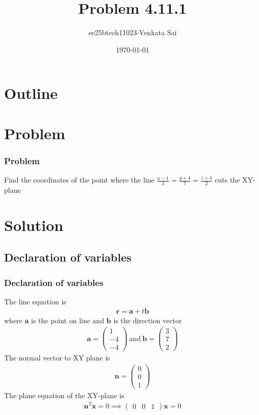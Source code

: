 \documentclass{beamer}
\title{Problem 4.11.1}
\author{ee25btech11023-Venkata Sai}
\date{\today}
\theoremstyle{remark}
\newcommand{\myvec}[1]{\ensuremath{\begin{pmatrix}#1\end{pmatrix}}}
\let\vec\mathbf
\numberwithin{equation}{section}
\begin{document}
\begin{frame}
\titlepage
\end{frame}

\section*{Outline}
\begin{frame}
\tableofcontents
\end{frame}

\section{Problem}

\begin{frame}
\frametitle{Problem}
Find the coordinates of the point where the line  $\frac{x-1}{3} = \frac{y+4}{7} = \frac{z+4}{2}$ cuts the XY-plane 
\end{frame}
\section{Solution}

\subsection{Declaration of variables}
\begin{frame}
\setcounter{section}{1}
\frametitle{Declaration of variables}
The line equation is  
\begin{align}
\vec{r} = \vec{a} + t \vec{b}
\end{align}
where $\vec{a}$ is the point on line and $\vec{b}$ is the direction vector
\begin{align}
\vec{a} = \myvec{1 \\ -4 \\ -4}\ \text{and}\
\vec{b} = \myvec{3 \\ 7 \\ 2}
\end{align}
The normal vector to XY plane is
\begin{align}
\vec{n} = \myvec{0 \\ 0 \\ 1}
\end{align}
The plane equation of the XY-plane is  
\begin{align}
\vec{n}^T \vec{x} = 0 \implies \myvec{0 & 0 & 1}\vec{x}=0
\end{align}
\end{frame}
\end{document}
